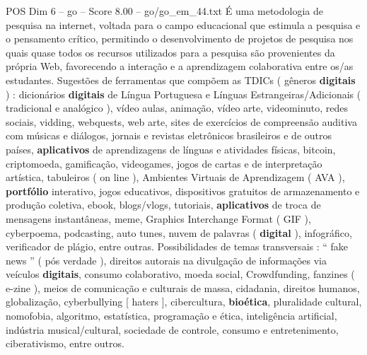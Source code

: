 \begin{textsample}{POS Dim 6 – go – Score 8.00 – go/go\_em\_44.txt}
É uma metodologia de pesquisa na internet, voltada para o campo educacional que estimula a pesquisa e o pensamento crítico, permitindo o desenvolvimento de projetos de pesquisa nos quais quase todos os recursos utilizados para a pesquisa são provenientes da própria Web, favorecendo a interação e a aprendizagem colaborativa entre os/as estudantes.
Sugestões de ferramentas que compõem as TDICs ( gêneros \textbf{digitais} ) : dicionários \textbf{digitais} de Língua Portuguesa e Línguas Estrangeiras/Adicionais ( tradicional e analógico ), vídeo aulas, animação, vídeo arte, videominuto, redes sociais, vidding, webquests, web arte, sites de exercícios de compreensão auditiva com músicas e diálogos, jornais e revistas eletrônicos brasileiros e de outros países, \textbf{aplicativos} de aprendizagens de línguas e atividades físicas, bitcoin, criptomoeda, gamificação, videogames, jogos de cartas e de interpretação artística, tabuleiros ( on line ), Ambientes Virtuais de Aprendizagem ( AVA ), \textbf{portfólio} interativo, jogos educativos, dispositivos gratuitos de armazenamento e produção coletiva, ebook, blogs/vlogs, tutoriais, \textbf{aplicativos} de troca de mensagens instantâneas, meme, Graphics Interchange Format ( GIF ), cyberpoema, podcasting, auto tunes, nuvem de palavras ( \textbf{digital} ), infográfico, verificador de plágio, entre outras.
Possibilidades de temas transversais : “ fake news ” ( pós verdade ), direitos autorais na divulgação de informações via veículos \textbf{digitais}, consumo colaborativo, moeda social, Crowdfunding, fanzines ( e-zine ), meios de comunicação e culturais de massa, cidadania, direitos humanos, globalização, cyberbullying [ haters ], cibercultura, \textbf{bioética}, pluralidade cultural, nomofobia, algoritmo, estatística, programação e ética, inteligência artificial, indústria musical/cultural, sociedade de controle, consumo e entretenimento, ciberativismo, entre outros.

\end{textsample}
